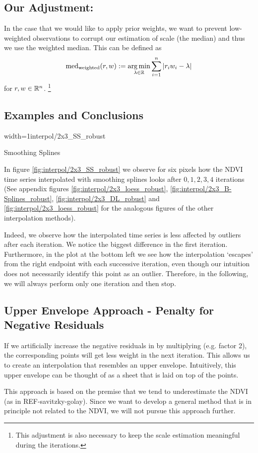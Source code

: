 {	\subsection{Our Adjustment:}{ 
		In the case that we would like to apply prior weights, we want to prevent low-weighted observations to corrupt our estimation of scale (the median) and thus we use the weighted median. This can be defined as
		$$
			\operatorname{med}_\text{weighted}(r,w) := \operatorname*{arg\, min}_{\lambda \in \mathbb{R}} \sum_{i=1}^n |r_iw_i -\lambda|
		$$
		for $r,w\in \mathbb{R}^n$. \footnote{This adjustment is also necessary to keep the scale estimation meaningful during the iterations.}
	}
	\subsection{Examples and Conclusions}{
		\begin{my_figure}[h]{width=1\textwidth}{interpol/2x3_SS_robust}
			\caption{Smoothing Splines \RobItPlot}
			\label{fig:interpol/2x3_SS_robust}
		\end{my_figure}

		In figure \ref{fig:interpol/2x3_SS_robust} we observe for six pixels how the NDVI time series interpolated with smoothing splines looks after $0,1,2,3,4$ iterations (See appendix figures \ref{fig:interpol/2x3_loess_robust}, \ref{fig:interpol/2x3_B-Splines_robust}, \ref{fig:interpol/2x3_DL_robust} and \ref{fig:interpol/2x3_loess_robust} for the analogous figures of the other interpolation methods).
		
		Indeed, we observe how the interpolated time series is less affected by outliers after each iteration. We notice the biggest difference in the first iteration. Furthermore, in the plot at the bottom left we see how the interpolation `escapes' from the right endpoint with each successive iteration, even though our intuition does not necessarily identify this point as an outlier. Therefore, in the following, we will always perform only one iteration and then stop.

	} 
	
	\subsection{Upper Envelope Approach - Penalty for Negative Residuals}
		If we artificially increase the negative residuals in  by multiplying (e.g. factor 2), the corresponding points will get less weight in the next iteration. This allows us to create an interpolation that resembles an upper envelope. Intuitively, this upper envelope can be thought of as a sheet that is laid on top of the points.
			
		This approach is based on the premise that we tend to underestimate the NDVI (as in REF-savitzky-golay). Since we want to develop a general method that is in principle not related to the NDVI, we will not pursue this approach further.	
}
